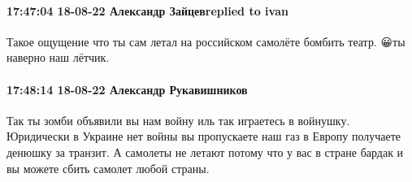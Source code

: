  
 
 
 
 

\paragraph{17:47:04 18-08-22 Александр Зайцевreplied to ivan}

Такое ощущение что ты сам летал на российском самолёте бомбить театр. 😀ты
наверно наш лётчик.

\paragraph{17:48:14 18-08-22 Александр Рукавишников}

Так ты зомби объявили вы нам войну иль так играетесь в войнушку. Юридически в
Украине нет войны вы пропускаете наш газ в Европу получаете денюшку за транзит.
А самолеты не летают потому что у вас в стране бардак и вы можете сбить самолет
любой страны.


